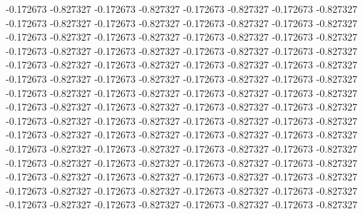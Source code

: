 -0.172673
-0.827327
-0.172673
-0.827327
-0.172673
-0.827327
-0.172673
-0.827327
-0.172673
-0.827327
-0.172673
-0.827327
-0.172673
-0.827327
-0.172673
-0.827327
-0.172673
-0.827327
-0.172673
-0.827327
-0.172673
-0.827327
-0.172673
-0.827327
-0.172673
-0.827327
-0.172673
-0.827327
-0.172673
-0.827327
-0.172673
-0.827327
-0.172673
-0.827327
-0.172673
-0.827327
-0.172673
-0.827327
-0.172673
-0.827327
-0.172673
-0.827327
-0.172673
-0.827327
-0.172673
-0.827327
-0.172673
-0.827327
-0.172673
-0.827327
-0.172673
-0.827327
-0.172673
-0.827327
-0.172673
-0.827327
-0.172673
-0.827327
-0.172673
-0.827327
-0.172673
-0.827327
-0.172673
-0.827327
-0.172673
-0.827327
-0.172673
-0.827327
-0.172673
-0.827327
-0.172673
-0.827327
-0.172673
-0.827327
-0.172673
-0.827327
-0.172673
-0.827327
-0.172673
-0.827327
-0.172673
-0.827327
-0.172673
-0.827327
-0.172673
-0.827327
-0.172673
-0.827327
-0.172673
-0.827327
-0.172673
-0.827327
-0.172673
-0.827327
-0.172673
-0.827327
-0.172673
-0.827327
-0.172673
-0.827327
-0.172673
-0.827327
-0.172673
-0.827327
-0.172673
-0.827327
-0.172673
-0.827327
-0.172673
-0.827327
-0.172673
-0.827327
-0.172673
-0.827327
-0.172673
-0.827327
-0.172673
-0.827327
-0.172673
-0.827327
